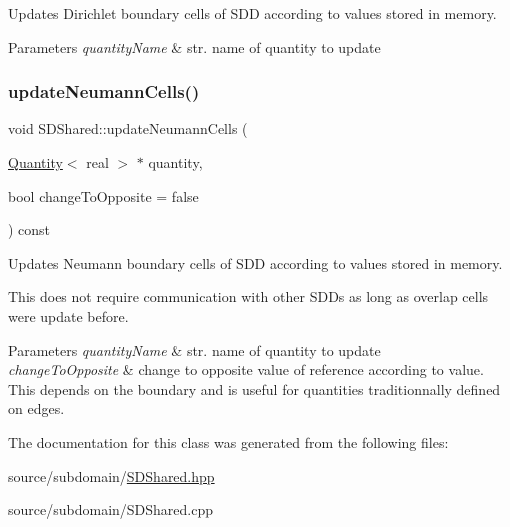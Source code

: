 Updates Dirichlet boundary cells of S\+DD according to values stored in memory. 


\begin{DoxyParams}{Parameters}
{\em quantity\+Name} & str. name of quantity to update \\
\hline
\end{DoxyParams}
\mbox{\label{classSDShared_aadaccd75a835ca8436c223c56a791c89}} 
\subsubsection{\texorpdfstring{update\+Neumann\+Cells()}{updateNeumannCells()}}
{\footnotesize\ttfamily void S\+D\+Shared\+::update\+Neumann\+Cells (\begin{DoxyParamCaption}\item[{\mbox{\hyperlink{classQuantity}{Quantity}}$<$ real $>$ $\ast$}]{quantity,  }\item[{bool}]{change\+To\+Opposite = {\ttfamily false} }\end{DoxyParamCaption}) const}



Updates Neumann boundary cells of S\+DD according to values stored in memory. 

This does not require communication with other S\+D\+Ds as long as overlap cells were update before.


\begin{DoxyParams}{Parameters}
{\em quantity\+Name} & str. name of quantity to update \\
\hline
{\em change\+To\+Opposite} & change to opposite value of reference according to value. This depends on the boundary and is useful for quantities traditionnally defined on edges. \\
\hline
\end{DoxyParams}


The documentation for this class was generated from the following files\+:\begin{DoxyCompactItemize}
\item 
source/subdomain/\mbox{\hyperlink{SDShared_8hpp}{S\+D\+Shared.\+hpp}}\item 
source/subdomain/S\+D\+Shared.\+cpp\end{DoxyCompactItemize}
